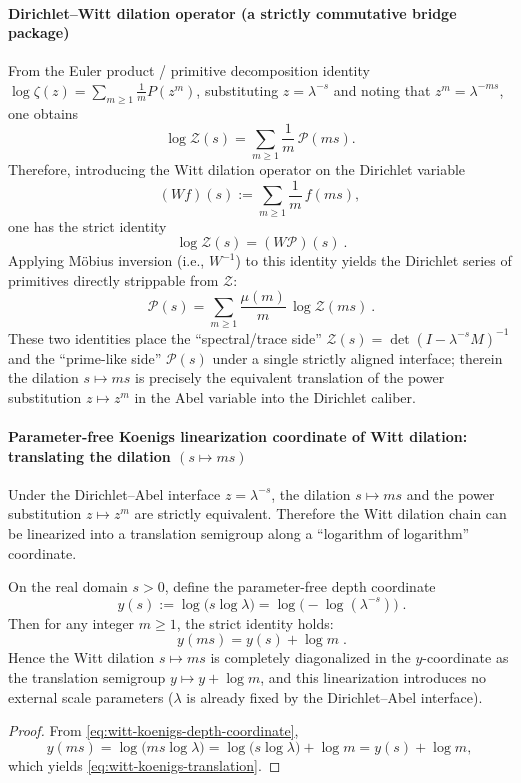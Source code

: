 \paragraph{Dirichlet--Witt dilation operator (a strictly commutative bridge package)}
From the Euler product / primitive decomposition identity
\(
\log\zeta(z)=\sum_{m\ge 1}\frac{1}{m}P(z^m)
\),
substituting $z=\lambda^{-s}$ and noting that $z^m=\lambda^{-ms}$, one obtains
\[
\log\mathcal{Z}(s)=\sum_{m\ge 1}\frac{1}{m}\,\mathcal{P}(ms).
\]
Therefore, introducing the Witt dilation operator on the Dirichlet variable
\[
(Wf)(s):=\sum_{m\ge 1}\frac{1}{m}\,f(ms),
\]
one has the strict identity
\[
\boxed{\ \log\mathcal{Z}(s)=(W\mathcal{P})(s)\ }.
\]
Applying M\"obius inversion (i.e., $W^{-1}$) to this identity yields the Dirichlet series of primitives directly strippable from $\mathcal{Z}$:
\[
\boxed{\ \mathcal{P}(s)=\sum_{m\ge 1}\frac{\mu(m)}{m}\,\log\mathcal{Z}(ms)\ }.
\]
These two identities place the ``spectral/trace side'' $\mathcal{Z}(s)=\det(I-\lambda^{-s}M)^{-1}$ and the ``prime-like side'' $\mathcal{P}(s)$ under a single strictly aligned interface; therein the dilation $s\mapsto ms$ is precisely the equivalent translation of the power substitution $z\mapsto z^m$ in the Abel variable into the Dirichlet caliber.

\paragraph{Parameter-free Koenigs linearization coordinate of Witt dilation: translating the dilation \texorpdfstring{$(s\mapsto ms)$}{(s->ms)}}
Under the Dirichlet--Abel interface \(z=\lambda^{-s}\), the dilation \(s\mapsto ms\) and the power substitution \(z\mapsto z^{m}\) are strictly equivalent.
Therefore the Witt dilation chain can be linearized into a translation semigroup along a ``logarithm of logarithm'' coordinate.

\begin{theorem}\label{thm:koenigs-linearization-witt-dilation}
On the real domain \(s>0\), define the parameter-free depth coordinate
\begin{equation}\label{eq:witt-koenigs-depth-coordinate}
\boxed{\;
y(s):=\log\!\bigl(s\log\lambda\bigr)
=\log\!\bigl(-\log(\lambda^{-s})\bigr)\; }.
\end{equation}
Then for any integer \(m\ge 1\), the strict identity holds:
\begin{equation}\label{eq:witt-koenigs-translation}
\boxed{\; y(ms)=y(s)+\log m\; }.
\end{equation}
Hence the Witt dilation \(s\mapsto ms\) is completely diagonalized in the \(y\)-coordinate as the translation semigroup \(y\mapsto y+\log m\), and this linearization introduces no external scale parameters (\(\lambda\) is already fixed by the Dirichlet--Abel interface).
\end{theorem}
\begin{proof}
From \eqref{eq:witt-koenigs-depth-coordinate},
\[
y(ms)=\log\!\bigl(ms\log\lambda\bigr)=\log\!\bigl(s\log\lambda\bigr)+\log m=y(s)+\log m,
\]
which yields \eqref{eq:witt-koenigs-translation}.
\end{proof}

